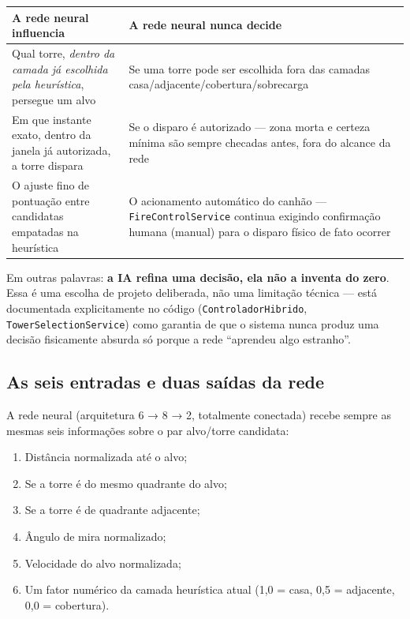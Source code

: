 \documentclass[11pt,a4paper]{article}
\begin{document}
\begin{center}
\begin{tabular}{|p{6.3cm}|p{6.3cm}|}
\hline
\textbf{A rede neural influencia} & \textbf{A rede neural nunca decide} \\
\hline
Qual torre, \emph{dentro da camada já escolhida pela heurística}, persegue um alvo &
Se uma torre pode ser escolhida fora das camadas casa/adjacente/cobertura/sobrecarga \\
\hline
Em que instante exato, dentro da janela já autorizada, a torre dispara &
Se o disparo é autorizado — zona morta e certeza mínima são sempre checadas antes, fora do
alcance da rede \\
\hline
O ajuste fino de pontuação entre candidatas empatadas na heurística &
O acionamento automático do canhão — \texttt{FireControlService} continua exigindo confirmação
humana (manual) para o disparo físico de fato ocorrer \\
\hline
\end{tabular}
\end{center}

Em outras palavras: \textbf{a IA refina uma decisão, ela não a inventa do zero}. Essa é uma
escolha de projeto deliberada, não uma limitação técnica — está documentada explicitamente no
código (\texttt{ControladorHibrido}, \texttt{TowerSelectionService}) como garantia de que o
sistema nunca produz uma decisão fisicamente absurda só porque a rede ``aprendeu algo
estranho''.

\subsection{As seis entradas e duas saídas da rede}

A rede neural (arquitetura 6 → 8 → 2, totalmente conectada) recebe sempre as mesmas seis
informações sobre o par alvo/torre candidata:

\begin{enumerate}[leftmargin=1.4em]
  \item Distância normalizada até o alvo;
  \item Se a torre é do mesmo quadrante do alvo;
  \item Se a torre é de quadrante adjacente;
  \item Ângulo de mira normalizado;
  \item Velocidade do alvo normalizada;
  \item Um fator numérico da camada heurística atual (1,0 = casa, 0,5 = adjacente, 0,0 =
    cobertura).
\end{enumerate}
\end{document}
